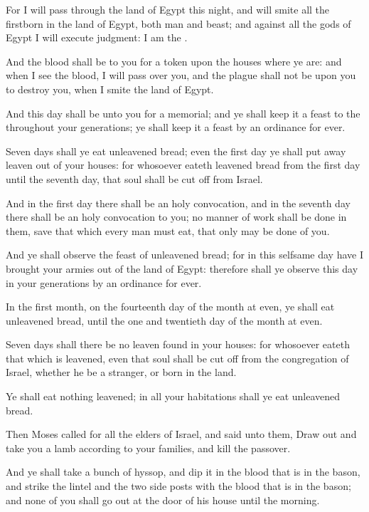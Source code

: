 \verse For I will pass through the land of Egypt this night, and will
smite all the firstborn in the land of Egypt, both man and beast; and
against all the gods of Egypt I will execute judgment: I am the \LORD.

\verse And the blood shall be to you for a token upon the houses where
ye are: and when I see the blood, I will pass over you, and the plague
shall not be upon you to destroy you, when I smite the land of Egypt.

\verse And this day shall be unto you for a memorial; and ye shall keep
it a feast to the \LORD throughout your generations; ye shall keep it a
feast by an ordinance for ever.

\verse Seven days shall ye eat unleavened bread; even the first day ye
shall put away leaven out of your houses: for whosoever eateth
leavened bread from the first day until the seventh day, that soul
shall be cut off from Israel.

\verse And in the first day there shall be an holy convocation, and in
the seventh day there shall be an holy convocation to you; no manner
of work shall be done in them, save that which every man must eat,
that only may be done of you.

\verse And ye shall observe the feast of unleavened bread; for in this
selfsame day have I brought your armies out of the land of Egypt:
therefore shall ye observe this day in your generations by an
ordinance for ever.

\verse In the first month, on the fourteenth day of the month at even,
ye shall eat unleavened bread, until the one and twentieth day of the
month at even.

\verse Seven days shall there be no leaven found in your houses: for
whosoever eateth that which is leavened, even that soul shall be cut
off from the congregation of Israel, whether he be a stranger, or born
in the land.

\verse Ye shall eat nothing leavened; in all your habitations shall ye
eat unleavened bread.

\verse Then Moses called for all the elders of Israel, and said unto
them, Draw out and take you a lamb according to your families, and
kill the passover.

\verse And ye shall take a bunch of hyssop, and dip it in the blood
that is in the bason, and strike the lintel and the two side posts
with the blood that is in the bason; and none of you shall go out at
the door of his house until the morning.

